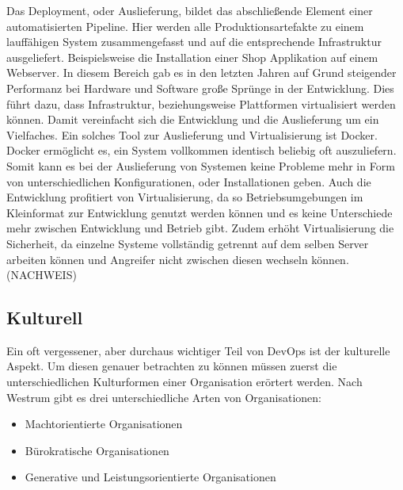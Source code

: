 Das Deployment, oder Auslieferung, bildet das abschließende Element einer automatisierten Pipeline. Hier werden alle Produktionsartefakte zu einem lauffähigen System zusammengefasst und auf die entsprechende Infrastruktur ausgeliefert. Beispielsweise die Installation einer Shop Applikation auf einem Webserver. In diesem Bereich gab es in den letzten Jahren auf Grund steigender Performanz bei Hardware und Software große Sprünge in der Entwicklung. Dies führt dazu, dass Infrastruktur, beziehungsweise Plattformen virtualisiert werden können. Damit vereinfacht sich die Entwicklung und die Auslieferung um ein Vielfaches. Ein solches Tool zur Auslieferung und Virtualisierung ist Docker.\\
Docker ermöglicht es, ein System vollkommen identisch beliebig oft auszuliefern. Somit kann es bei der Auslieferung von Systemen keine Probleme mehr in Form von unterschiedlichen Konfigurationen, oder Installationen geben. Auch die Entwicklung profitiert von Virtualisierung, da so Betriebsumgebungen im Kleinformat zur Entwicklung genutzt werden können und es keine Unterschiede mehr zwischen Entwicklung und Betrieb gibt. Zudem erhöht Virtualisierung die Sicherheit, da einzelne Systeme vollständig getrennt auf dem selben Server arbeiten können und Angreifer nicht zwischen diesen wechseln können. (NACHWEIS)

\subsection{Kulturell}
Ein oft vergessener, aber durchaus wichtiger Teil von DevOps ist der kulturelle Aspekt. Um diesen genauer betrachten zu können müssen zuerst die unterschiedlichen Kulturformen einer Organisation erörtert werden.
Nach Westrum \parencite[Vgl.][]{Westrum:1988} gibt es drei unterschiedliche Arten von Organisationen:

\begin{itemize}
\item Machtorientierte Organisationen
\item Bürokratische Organisationen
\item Generative und Leistungsorientierte Organisationen
\end{itemize}

